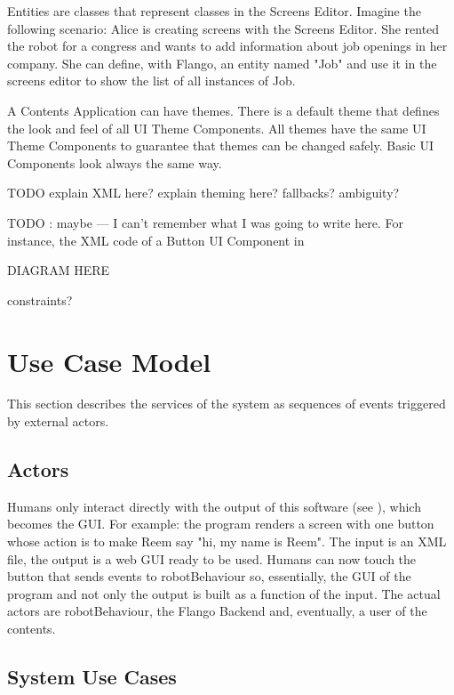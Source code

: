 Entities are classes that represent classes in the Screens Editor. 
Imagine the following scenario: Alice is creating screens with the Screens Editor.
She rented the robot for a congress and wants to add information about job openings in her company.
She can define, with Flango, an entity named "Job" and use it in the screens editor to show the list of all instances of Job.

A Contents Application can have themes.
There is a default theme that defines the look and feel of all UI Theme Components.
All themes have the same UI Theme Components to guarantee that themes can be changed safely.
Basic UI Components look always the same way.

TODO explain XML here? explain theming here? fallbacks? ambiguity?

TODO : maybe --- I can't remember what I was going to write here.
For instance, the \ac{XML} code of a Button UI Component in 



DIAGRAM HERE


constraints?

\section{Use Case Model}
This section describes the services of the system as sequences of events triggered by external actors.

\subsection{Actors}
Humans only interact directly with the output of this software (see ), which becomes the \ac{GUI}.
For example: the program renders a screen with one button whose action is to make Reem say "hi, my name is Reem".
The input is an \ac{XML} file, the output is a web \ac{GUI} ready to be used.
Humans can now touch the button that sends events to robotBehaviour so, essentially, the \ac{GUI} of the program and not only the output is built as a function of the input.
The actual actors are robotBehaviour, the Flango Backend  and, eventually, a user of the contents.


\subsection{System Use Cases}

